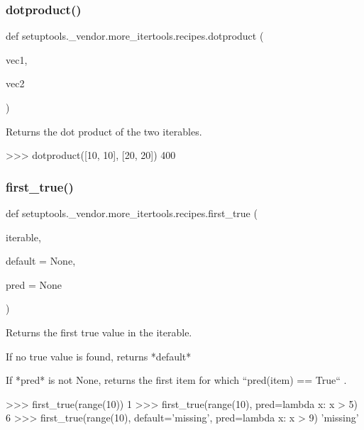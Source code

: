 \subsubsection{\texorpdfstring{dotproduct()}{dotproduct()}}
{\footnotesize\ttfamily def setuptools.\+\_\+vendor.\+more\+\_\+itertools.\+recipes.\+dotproduct (\begin{DoxyParamCaption}\item[{}]{vec1,  }\item[{}]{vec2 }\end{DoxyParamCaption})}

\begin{DoxyVerb}Returns the dot product of the two iterables.

>>> dotproduct([10, 10], [20, 20])
400\end{DoxyVerb}
 \mbox{\label{namespacesetuptools_1_1__vendor_1_1more__itertools_1_1recipes_a6112b560601bc07e91087a61ff014842}} 
\subsubsection{\texorpdfstring{first\+\_\+true()}{first\_true()}}
{\footnotesize\ttfamily def setuptools.\+\_\+vendor.\+more\+\_\+itertools.\+recipes.\+first\+\_\+true (\begin{DoxyParamCaption}\item[{}]{iterable,  }\item[{}]{default = {\ttfamily None},  }\item[{}]{pred = {\ttfamily None} }\end{DoxyParamCaption})}

\begin{DoxyVerb}Returns the first true value in the iterable.

If no true value is found, returns *default*

If *pred* is not None, returns the first item for which
``pred(item) == True`` .

    >>> first_true(range(10))
    1
    >>> first_true(range(10), pred=lambda x: x > 5)
    6
    >>> first_true(range(10), default='missing', pred=lambda x: x > 9)
    'missing'\end{DoxyVerb}
 \mbox{\label{namespacesetuptools_1_1__vendor_1_1more__itertools_1_1recipes_a4dd6b39b88df1a34e8bf76d98cce13f6}} 
